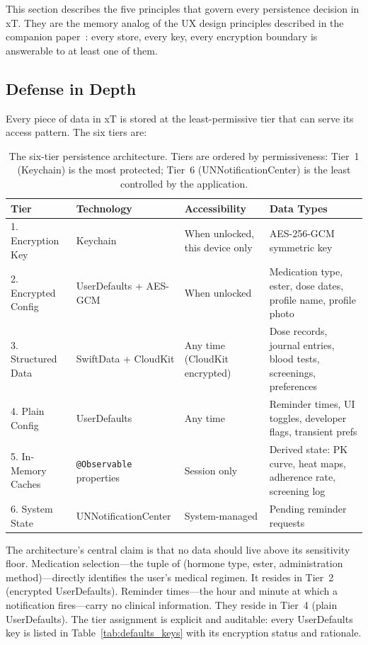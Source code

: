\documentclass[11pt,a4paper]{article}
\newcommand{\code}[1]{\texttt{\small #1}}
\begin{document}
This section describes the five principles that govern every persistence
decision in xT. They are the memory analog of the UX design principles
described in the companion paper~\cite{xtux}: every store, every key, every
encryption boundary is answerable to at least one of them.

\subsection{Defense in Depth}
\label{sec:defense_in_depth}

Every piece of data in xT is stored at the least-permissive tier that can
serve its access pattern. The six tiers are:

\begin{table}[h]
\centering
\small
\begin{tabular}{@{}p{2.2cm}p{3.2cm}p{2.4cm}p{6.8cm}@{}}
\toprule
\textbf{Tier} & \textbf{Technology} & \textbf{Accessibility} & \textbf{Data Types} \\
\midrule
1. Encryption Key & Keychain & When unlocked, this device only &
   AES-256-GCM symmetric key \\
\midrule
2. Encrypted Config & UserDefaults + AES-GCM & When unlocked &
   Medication type, ester, dose dates, profile name, profile photo \\
\midrule
3. Structured Data & SwiftData + CloudKit & Any time (CloudKit encrypted) &
   Dose records, journal entries, blood tests, screenings, preferences \\
\midrule
4. Plain Config & UserDefaults & Any time &
   Reminder times, UI toggles, developer flags, transient prefs \\
\midrule
5. In-Memory Caches & \code{@Observable} properties & Session only &
   Derived state: PK curve, heat maps, adherence rate, screening log \\
\midrule
6. System State & UNNotificationCenter & System-managed &
   Pending reminder requests \\
\bottomrule
\end{tabular}
\caption{The six-tier persistence architecture. Tiers are ordered by
permissiveness: Tier~1 (Keychain) is the most protected; Tier~6
(UNNotificationCenter) is the least controlled by the application.}
\label{tab:tiers}
\end{table}

The architecture's central claim is that no data should live above its
sensitivity floor. Medication selection---the tuple of (hormone type, ester,
administration method)---directly identifies the user's medical regimen. It
resides in Tier~2 (encrypted UserDefaults). Reminder times---the hour and
minute at which a notification fires---carry no clinical information. They
reside in Tier~4 (plain UserDefaults). The tier assignment is explicit and
auditable: every UserDefaults key is listed in
Table~\ref{tab:defaults_keys} with its encryption status and rationale.
\end{document}
